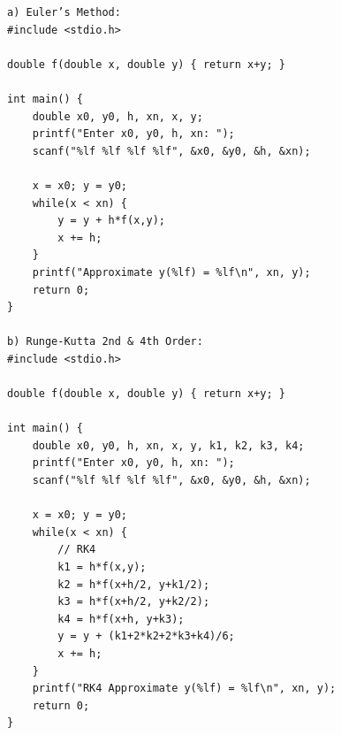 \begin{verbatim}
a) Euler’s Method:
#include <stdio.h>

double f(double x, double y) { return x+y; }

int main() {
    double x0, y0, h, xn, x, y;
    printf("Enter x0, y0, h, xn: ");
    scanf("%lf %lf %lf %lf", &x0, &y0, &h, &xn);

    x = x0; y = y0;
    while(x < xn) {
        y = y + h*f(x,y);
        x += h;
    }
    printf("Approximate y(%lf) = %lf\n", xn, y);
    return 0;
}

b) Runge-Kutta 2nd & 4th Order:
#include <stdio.h>

double f(double x, double y) { return x+y; }

int main() {
    double x0, y0, h, xn, x, y, k1, k2, k3, k4;
    printf("Enter x0, y0, h, xn: ");
    scanf("%lf %lf %lf %lf", &x0, &y0, &h, &xn);

    x = x0; y = y0;
    while(x < xn) {
        // RK4
        k1 = h*f(x,y);
        k2 = h*f(x+h/2, y+k1/2);
        k3 = h*f(x+h/2, y+k2/2);
        k4 = h*f(x+h, y+k3);
        y = y + (k1+2*k2+2*k3+k4)/6;
        x += h;
    }
    printf("RK4 Approximate y(%lf) = %lf\n", xn, y);
    return 0;
}
\end{verbatim}